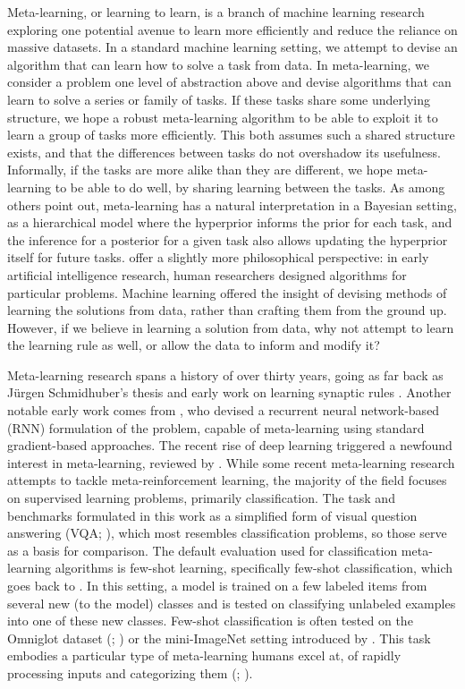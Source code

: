 Meta-learning, or learning to learn, is a branch of machine learning research exploring one potential avenue to learn more efficiently and reduce the reliance on massive datasets. In a standard machine learning setting, we attempt to devise an algorithm that can learn how to solve a task from data. In meta-learning, we consider a problem one level of abstraction above and devise algorithms that can learn to solve a series or family of tasks. If these tasks share some underlying structure, we hope a robust meta-learning algorithm to be able to exploit it to learn a group of tasks more efficiently. This both assumes such a shared structure exists, and that the differences between tasks do not overshadow its usefulness. Informally, if the tasks are more alike than they are different, we hope meta-learning to be able to do well, by sharing learning between the tasks. As \textcite{Hochreiter2001} among others point out, meta-learning has a natural interpretation in a Bayesian setting, as a hierarchical model where the hyperprior informs the prior for each task, and the inference for a posterior for a given task also allows updating the hyperprior itself for future tasks. \textcite{Lansdell2018} offer a slightly more philosophical perspective: in early artificial intelligence research, human researchers designed algorithms for particular problems. Machine learning offered the insight of devising methods of learning the solutions from data, rather than crafting them from the ground up. However, if we believe in learning a solution from data, why not attempt to learn the learning rule as well, or allow the data to inform and modify it? 

Meta-learning research spans a history of over thirty years, going as far back as J\"urgen Schmidhuber's thesis \parencite{Schmidhuber1987} and early work on learning synaptic rules \parencite{Bengio1991}. Another notable early work comes from \textcite{Hochreiter2001}, who devised a recurrent neural network-based (RNN) formulation of the problem, capable of meta-learning using standard gradient-based approaches. The recent rise of deep learning triggered a newfound interest in meta-learning, reviewed by \textcite{Lansdell2018}. While some recent meta-learning research attempts to tackle meta-reinforcement learning, the majority of the field focuses on supervised learning problems, primarily classification. The task and benchmarks formulated in this work as a simplified form of visual question answering (VQA; \cite{Antol2015}), which most resembles classification problems, so those serve as a basis for comparison. The default evaluation used for classification meta-learning algorithms is few-shot learning, specifically few-shot classification, which goes back to \textcite{LiFei-Fei2006}. In this setting, a model is trained on a few labeled items from several new (to the model) classes and is tested on classifying unlabeled examples into one of these new classes. Few-shot classification is often tested on the Omniglot dataset (\cite{Lake2015}; \cite{Lake2019}) or the mini-ImageNet setting introduced by \textcite{Vinyals2016}. This task embodies a particular type of meta-learning humans excel at, of rapidly processing inputs and categorizing them (\cite{Thorpe1996}; \cite{FeiFei2002}).

